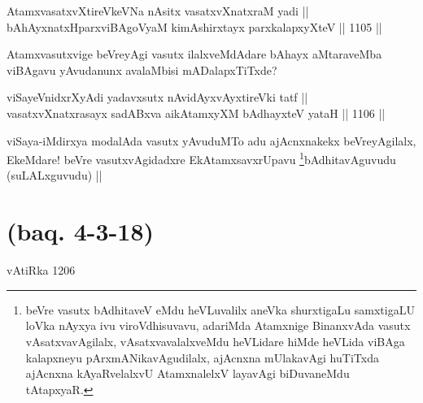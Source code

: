 \begin{shl}
AtamxvasatxvXtireVkeVNa nAsitx vasatxvXnatxraM yadi || \\
bAhAyxnatxHparxviBAgoV\s yaM kimAshirxtayx parxkalapxyXteV ||  1105 ||  
\end{shl}

\begin{artha}
Atamxvasutxvige beVreyAgi vasutx ilalxveMdAdare bAhayx aMtaraveMba viBAgavu yAvudanunx avalaMbisi mADalapxTiTxde?
\end{artha}


\begin{shl}
viSayeVnidxrXyAdi yadavxsutx nAvidAyxvAyxtireVki tatf || \\
vasatxvXnatxrasayx sadABxva aikAtamxyXM bAdhayxteV yataH ||  1106 ||  
\end{shl}

\begin{artha}
viSaya-iMdirxya modalAda vasutx yAvuduMTo adu ajAcnxnakekx beVreyAgilalx, EkeMdare! beVre vasutxvAgidadxre EkAtamxsavxrUpavu \footnote{beVre vasutx bAdhitaveV eMdu heVLuvalilx aneVka shurxtigaLu samxtigaLU loVka nAyxya ivu viroVdhisuvavu, adariMda Atamxnige BinanxvAda vasutx vAsatxvavAgilalx, vAsatxvavalalxveMdu heVLidare hiMde heVLida viBAga kalapxneyu pArxmANikavAgudilalx, ajAcnxna mUlakavAgi huTiTxda ajAcnxna kAyaRvelalxvU AtamxnalelxV layavAgi biDuvaneMdu tAtapxyaR.}bAdhitavAguvudu (suLALxguvudu) ||
\end{artha}

\section*{(baq. 4-3-18)} vAtiRka 1206

